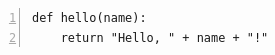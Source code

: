 \documentclass{article}
\begin{document}
\begin{Verbatim}[numbers=left,frame=single,breaklines]
def hello(name):
    return "Hello, " + name + "!"
\end{Verbatim}
\end{document}
